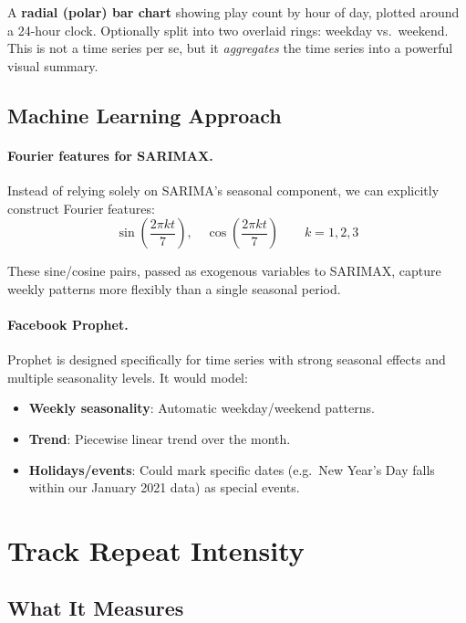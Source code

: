 \documentclass[12pt, a4paper]{article}
\begin{document}
A \textbf{radial (polar) bar chart} showing play count by hour of day,
plotted around a 24-hour clock. Optionally split into two overlaid rings:
weekday vs.\ weekend. This is not a time series per se, but it
\emph{aggregates} the time series into a powerful visual summary.

\subsection{Machine Learning Approach}

\paragraph{Fourier features for SARIMAX.}
Instead of relying solely on SARIMA's seasonal component, we can explicitly
construct Fourier features:
\[
    \sin\!\left(\frac{2\pi k t}{7}\right), \quad
    \cos\!\left(\frac{2\pi k t}{7}\right)
    \qquad k = 1, 2, 3
\]

These sine/cosine pairs, passed as exogenous variables to SARIMAX, capture
weekly patterns more flexibly than a single seasonal period.

\paragraph{Facebook Prophet.}
Prophet is designed specifically for time series with strong seasonal effects
and multiple seasonality levels. It would model:
\begin{itemize}
    \item \textbf{Weekly seasonality}: Automatic weekday/weekend patterns.
    \item \textbf{Trend}: Piecewise linear trend over the month.
    \item \textbf{Holidays/events}: Could mark specific dates (e.g.\ New
          Year's Day falls within our January 2021 data) as special events.
\end{itemize}

\section{Track Repeat Intensity}

\subsection{What It Measures}
\end{document}
